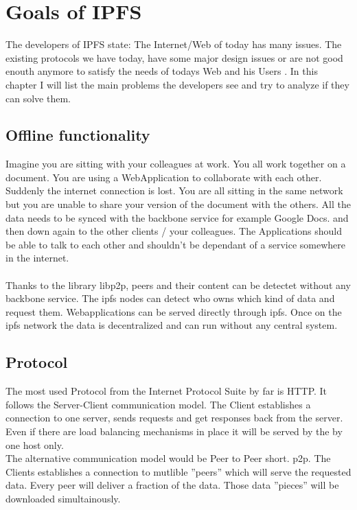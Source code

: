 \documentclass[a4paper,11pt, oneside]{report}
\theoremstyle{definition}
\begin{document}
\chapter{Goals of IPFS}
The developers of IPFS  state: The Internet/Web of today has many issues.  The existing protocols we have today, have some major design issues or are not good enouth anymore to satisfy the needs of todays Web and his Users \cite{TodaysProblems}. In this chapter I will list the main problems the developers see and try to analyze if they can solve them.


\section{Offline functionality}
Imagine you are sitting with your colleagues at work. You all work together on a document. You are using a WebApplication to collaborate with each other. Suddenly the internet connection is lost. You are all sitting in the same network but you are unable to share your version of the document with the others. All the data needs to be synced with the backbone service for example Google Docs. and then down again to the other clients / your colleagues. The Applications should be able to talk to each other and shouldn't be dependant of a service somewhere in the internet.\\ \\
Thanks to the library libp2p, peers and their content can be detectet without any backbone service. The ipfs nodes can detect who owns which kind of data and request them. Webapplications can be served directly through ipfs. Once on the ipfs network the data is decentralized and can run without any central system. 

\section{Protocol}
The most used Protocol from the Internet Protocol Suite by far is HTTP. It follows the Server-Client communication model. The Client establishes a connection to one server, sends requests and get responses back from the server. Even if there are load balancing mechanisms in place it will be served by the by one host only.\\[0.3cm]
The alternative communication model would be Peer to Peer short. p2p. The Clients establishes a connection to mutlible ''peers'' which will serve the requested data. Every peer will deliver a fraction of the data. Those data ''pieces'' will be downloaded simultainously.
\end{document}
